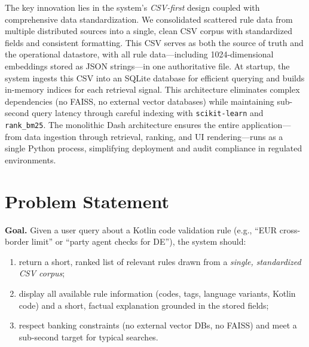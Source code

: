 The key innovation lies in the system's \emph{CSV-first} design coupled with comprehensive data standardization. We consolidated scattered rule data from multiple distributed sources into a single, clean CSV corpus with standardized fields and consistent formatting. This CSV serves as both the source of truth and the operational datastore, with all rule data—including 1024-dimensional embeddings stored as JSON strings—in one authoritative file. At startup, the system ingests this CSV into an SQLite database for efficient querying and builds in-memory indices for each retrieval signal. This architecture eliminates complex dependencies (no FAISS, no external vector databases) while maintaining sub-second query latency through careful indexing with \texttt{scikit-learn} and \texttt{rank\_bm25}. The monolithic Dash architecture ensures the entire application—from data ingestion through retrieval, ranking, and UI rendering—runs as a single Python process, simplifying deployment and audit compliance in regulated environments.

\section{Problem Statement}
\textbf{Goal.} Given a user query about a Kotlin code validation rule (e.g., ``EUR cross-border limit'' or ``party agent checks for DE''), the system should:
\begin{enumerate}[leftmargin=*,itemsep=2pt,topsep=2pt]
 \item return a short, ranked list of relevant rules drawn from a \emph{single, standardized CSV corpus};
 \item display all available rule information (codes, tags, language variants, Kotlin code) and a short, factual explanation grounded in the stored fields;
 \item respect banking constraints (no external vector DBs, no FAISS) and meet a sub-second target for typical searches.
\end{enumerate}

